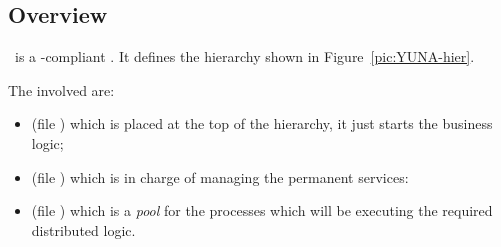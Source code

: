 \subsection{Overview}

\YUNA\ is a \OTP-compliant . It defines the hierarchy
shown in Figure~\ref{pic:YUNA-hier}.


The involved  are:
\begin{itemize}

    \item   {} (file ) which is
            placed at the top of the hierarchy, it just starts the
            business logic;

    \item   {} (file )
            which is in charge of managing the permanent services:

    \item   {} (file )
            which is a \emph{pool} for the processes which will be
            executing the required distributed logic.

\end{itemize}

